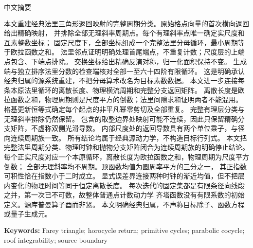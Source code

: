 \documentclass[10pt]{article}
\begin{document}
\begin{abstract}
period is the inverse square scale. Every irrational slope is nonperiodic.
The roof has mean pi squared over three and belongs to the positive
Lebesgue-power spaces precisely below exponent two. An explicit
number-theoretic error bound compares the two clocks asymptotically,
without identifying them within a scale layer. The fixed set at every
iterate is a finite union of radial segments and is uncountable already
at the first iterate. Thus ordinary finite-cardinality dynamical zeta is
undefined for the whole section, despite its native coprime arithmetic.
The source Koopman operator is unitary but noncompact. All results are
source-local with classical ownership; no target divisor, functional
equation or quantum-generator construction is claimed.
\fi
\end{abstract}
\begin{center}{\cjkfont 中文摘要}\end{center}
{\cjkfont\small\raggedright
\ifcase\CRevisionRound
本文重建经典法里三角形返回映射的完整周期分类。原始格点向量的首次横向返回给出精确映射，
并排除全部无理斜率周期点。每个有理斜率点唯一确定实尺度和互素整数坐标；
固定尺度下，全部坐标组成一个完整法里分母循环，最小周期等于欧拉函数之和。
法里邻点证明明确处理首尾端点，不重复计数；尺度层的上端点包含、下端点排除。
交换坐标给出精确反演对称，归一化面积保持不变。
生成端与独立排序法里分数的检查端核对全部一至六十四阶有限循环。
这是明确承认经典归属的源系统重建，不把分母算术改名为目标素数数据。
\or
本文进一步连接每条本原法里循环的离散长度、物理横流周期和完整分支返回矩阵。
离散长度是欧拉函数之和，物理周期则是尺度平方的倒数；法里间隙求和证明两者不能混用。
格基更新恒等式确定每个起点的非平凡幂零剪切及全部重复。
完整有理层分类与无理斜率排除仍然保留。
包含的取整边界处映射可能不连续，因此只保留精确分支矩阵，不虚称双侧光滑导数。
内部尺度处的返回导数具有两个单位乘子，与径向连续周期族一致。
所有结论均属于经典源动力学，不构造目标行列式。
\else
本文把完整法里周期分类、物理时钟和抛物分支矩阵闭合为连续周期族的明确停止结论。
每个正实尺度对应一个本原循环，离散长度为欧拉函数之和，物理周期为尺度平方倒数；
全部无理斜率均不周期。顶函数均值为圆周率平方的三分之一，
其正指数可积性恰在指数小于二时成立。
显式误差界连接两种时钟的渐近均值，但不把层内变化的物理时间等同于恒定离散长度。
每次迭代的固定集都是有限条径向线段之并，第一次已不可数，故整体普通点计数动力学
齐塔函数没有有限系数的初始定义。源库普曼算子酉而非紧。
本文明确经典归属，不声称目标除子、函数方程或量子生成元。
\fi\par}
\medskip
\noindent\textbf{Keywords:} Farey triangle; horocycle return; primitive cycles; parabolic cocycle; roof integrability; source boundary
\end{document}
